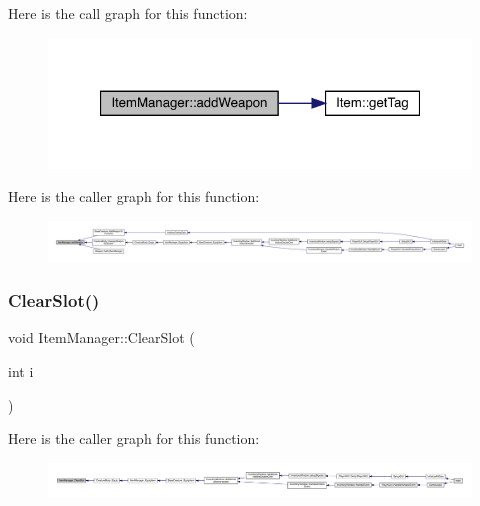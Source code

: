Here is the call graph for this function\+:
\nopagebreak
\begin{figure}[H]
\begin{center}
\leavevmode
\includegraphics[width=321pt]{dc/de1/class_item_manager_a2631fb34c48555098029e18e66d7eb05_cgraph}
\end{center}
\end{figure}
Here is the caller graph for this function\+:
\nopagebreak
\begin{figure}[H]
\begin{center}
\leavevmode
\includegraphics[width=350pt]{dc/de1/class_item_manager_a2631fb34c48555098029e18e66d7eb05_icgraph}
\end{center}
\end{figure}
\mbox{\label{class_item_manager_a2aa35a782e14a35ad9477c512e256303}} 
\subsubsection{\texorpdfstring{Clear\+Slot()}{ClearSlot()}}
{\footnotesize\ttfamily void Item\+Manager\+::\+Clear\+Slot (\begin{DoxyParamCaption}\item[{int}]{i }\end{DoxyParamCaption})}

Here is the caller graph for this function\+:
\nopagebreak
\begin{figure}[H]
\begin{center}
\leavevmode
\includegraphics[width=350pt]{dc/de1/class_item_manager_a2aa35a782e14a35ad9477c512e256303_icgraph}
\end{center}
\end{figure}
\mbox{\label{class_item_manager_a55d0009a402e2f5fc3a18cf0629cec64}} 
